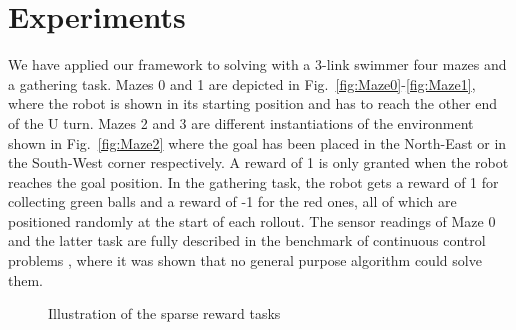 \documentclass{article} %
\begin{document}
\section{Experiments}
We have applied our framework to solving with a 3-link swimmer four mazes and a gathering task. Mazes 0 and 1 are depicted in Fig.\ \ref{fig:Maze0}-\ref{fig:Maze1}, where the robot is shown in its starting position and has to reach the other end of the U turn. Mazes 2 and 3 are different instantiations of the environment shown in Fig.\ \ref{fig:Maze2} where the goal has been placed in the North-East or in the South-West corner respectively. A reward of 1 is only granted when the robot reaches the goal position. In the gathering task, the robot gets a reward of 1 for collecting green balls and a reward of -1 for the red ones, all of which are positioned randomly at the start of each rollout. The sensor readings of Maze 0 and the latter task are fully described in the benchmark of continuous control problems \citep{yuan2015rllab}, where it was shown that no general purpose algorithm could solve them.

\begin{figure}[h!]
	\centering
	\caption{Illustration of the sparse reward tasks}
	\label{fig:snn_multimodal_MI}
\end{figure}
\end{document}
